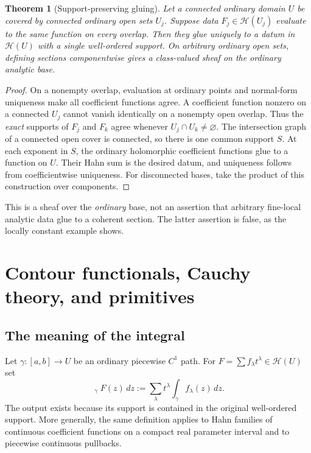 \documentclass[11pt,letterpaper]{article}
\newtheorem{theorem}{Theorem}[section]
\theoremstyle{definition}
\theoremstyle{remark}
\newcommand{\HH}{\mathcal H}
\newcommand{\HInt}{\mathop{\int^{\!H}}\nolimits}
\numberwithin{equation}{section}
\begin{document}
\begin{theorem}[Support-preserving gluing]\label{thm:gluing}
Let a connected ordinary domain $U$ be covered by connected ordinary open sets $U_j$. Suppose data $F_j\in\HH(U_j)$ evaluate to the same function on every overlap. Then they glue uniquely to a datum in $\HH(U)$ with a single well-ordered support. On arbitrary ordinary open sets, defining sections componentwise gives a class-valued sheaf on the ordinary analytic base.
\end{theorem}
\begin{proof}
On a nonempty overlap, evaluation at ordinary points and normal-form uniqueness make all coefficient functions agree. A coefficient function nonzero on a connected $U_j$ cannot vanish identically on a nonempty open overlap. Thus the \emph{exact} supports of $F_j$ and $F_k$ agree whenever $U_j\cap U_k\ne\varnothing$. The intersection graph of a connected open cover is connected, so there is one common support $S$. At each exponent in $S$, the ordinary holomorphic coefficient functions glue to a function on $U$. Their Hahn sum is the desired datum, and uniqueness follows from coefficientwise uniqueness. For disconnected bases, take the product of this construction over components.
\end{proof}
This is a sheaf over the \emph{ordinary} base, not an assertion that arbitrary fine-local analytic data glue to a coherent section. The latter assertion is false, as the locally constant example shows.

\section{Contour functionals, Cauchy theory, and primitives}\label{sec:contours}
\subsection{The meaning of the integral}
Let $\gamma:[a,b]\to U$ be an ordinary piecewise $C^1$ path. For $F=\sum f_\lambda t^\lambda\in\HH(U)$ set
\begin{equation}\label{eq:Hintegral}
 \HInt_\gamma F(z)\,dz
 :=\sum_\lambda t^\lambda\int_\gamma f_\lambda(z)\,dz.
\end{equation}
The output exists because its support is contained in the original well-ordered support. More generally, the same definition applies to Hahn families of continuous coefficient functions on a compact real parameter interval and to piecewise continuous pullbacks.
\end{document}
